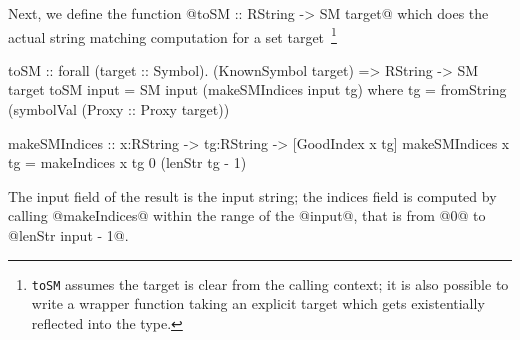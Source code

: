 Next, we define the function @toSM :: RString -> SM target@ which does
the actual string matching computation for a set
target~\footnote{\texttt{toSM} assumes the target is clear from the
  calling context; it is also possible to write a wrapper function
  taking an explicit target which gets existentially reflected into
  the type.}
%
%
\begin{code}
toSM :: forall (target :: Symbol). (KnownSymbol target)
     => RString -> SM target
toSM input = SM input (makeSMIndices input tg) where
  tg = fromString (symbolVal (Proxy :: Proxy target))

makeSMIndices
  :: x:RString -> tg:RString -> [GoodIndex x tg]
makeSMIndices x tg
  = makeIndices x tg 0 (lenStr tg - 1)
\end{code}
%
The input field of the result is the input string;
the indices field is computed by calling @makeIndices@
within the range of the @input@, that is from
@0@ to @lenStr input - 1@.
%
\begin{code}
\end{code}

